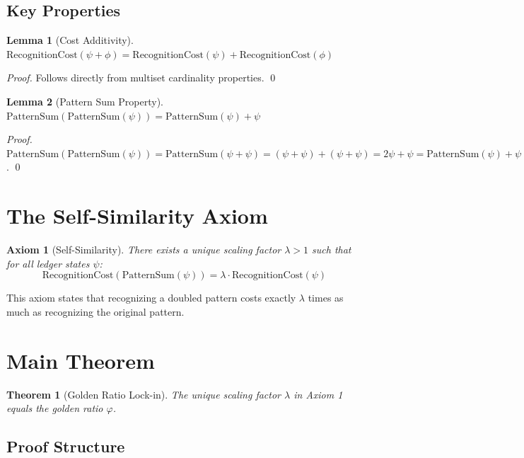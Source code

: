 \documentclass[11pt,a4paper]{article}
\newtheorem{theorem}{Theorem}
\newtheorem{lemma}{Lemma}
\newtheorem{axiom}{Axiom}
\begin{document}
\subsection{Key Properties}

\begin{lemma}[Cost Additivity]
$\text{RecognitionCost}(\psi + \phi) = \text{RecognitionCost}(\psi) + \text{RecognitionCost}(\phi)$
\end{lemma}

\begin{proof}
Follows directly from multiset cardinality properties. \qed
\end{proof}

\begin{lemma}[Pattern Sum Property]
$\text{PatternSum}(\text{PatternSum}(\psi)) = \text{PatternSum}(\psi) + \psi$
\end{lemma}

\begin{proof}
$\text{PatternSum}(\text{PatternSum}(\psi)) = \text{PatternSum}(\psi + \psi) = (\psi + \psi) + (\psi + \psi) = 2\psi + \psi = \text{PatternSum}(\psi) + \psi$. \qed
\end{proof}

\section{The Self-Similarity Axiom}

\begin{axiom}[Self-Similarity]
There exists a unique scaling factor $\lambda > 1$ such that for all ledger states $\psi$:
$$\text{RecognitionCost}(\text{PatternSum}(\psi)) = \lambda \cdot \text{RecognitionCost}(\psi)$$
\end{axiom}

This axiom states that recognizing a doubled pattern costs exactly $\lambda$ times as much as recognizing the original pattern.

\section{Main Theorem}

\begin{theorem}[Golden Ratio Lock-in]
The unique scaling factor $\lambda$ in Axiom 1 equals the golden ratio $\varphi$.
\end{theorem}

\subsection{Proof Structure}
\end{document}
